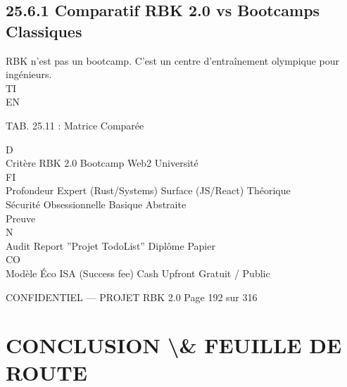 \documentclass[12pt,landscape,a4paper]{article}
\newenvironment{confidential}
{\begin{tcolorbox}[
    colback=rbkred!5!white,
    colframe=rbkred!75!black,
    title=CONFIDENTIEL,
    fonttitle=\bfseries\color{white},
    coltitle=rbkred!75!black,
    breakable,
    enhanced,
    frame hidden,
    borderline west={2pt}{0pt}{rbkred!75!black}
]}
{\end{tcolorbox}}
\begin{document}
\subsection{25.6.1 Comparatif RBK 2.0 vs Bootcamps Classiques}
RBK n’est pas un bootcamp. C’est un centre d’entraînement olympique pour ingénieurs.\\
\vspace{0.5em}
\vspace{0.5em}
\vspace{0.5em}
\vspace{0.5em}
TI\\
EN\\
\begin{center}\begin{tabular}TAB. 25.11 : Matrice Comparée\end{tabular}\end{center}
\vspace{0.5em}
\vspace{0.5em}
\vspace{0.5em}
\vspace{0.5em}
D\\
Critère    RBK 2.0               Bootcamp Web2 Université\\
\vspace{0.5em}
\vspace{0.5em}
\vspace{0.5em}
\vspace{0.5em}
FI\\
Profondeur Expert (Rust/Systems) Surface (JS/React) Théorique\\
Sécurité   Obsessionnelle        Basique            Abstraite\\
Preuve\\
N\\
Audit Report          ”Projet TodoList” Diplôme Papier\\
CO\\
Modèle Éco ISA (Success fee)     Cash Upfront       Gratuit / Public\\
\vspace{0.5em}
\vspace{0.5em}
\vspace{0.5em}
\vspace{0.5em}
\begin{confidential}CONFIDENTIEL — PROJET RBK 2.0                                   Page 192 sur 316\end{confidential}
\section{CONCLUSION \textbackslash{}& FEUILLE DE ROUTE}
\vspace{0.5em}
\vspace{0.5em}
\end{document}
